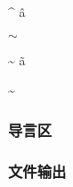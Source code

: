 \documentclass{ctexart}
\begin{document}
            {\rmfamily {}}

            \^{} \^a

            $\sim$
            
            \~{} \~a
            
            \textasciitilde

        \subsubsection{导言区}

        \subsubsection{文件输出}
\end{document}

